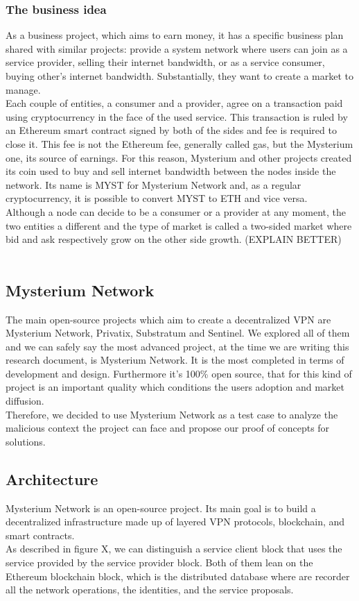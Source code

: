 \documentclass[]{article}
\begin{document}
	\subsubsection{The business idea}
	As a business project, which aims to earn money, it has a specific business plan shared with similar projects: provide a system network where users can join as a service provider, selling their internet bandwidth, or as a service consumer, buying other's internet bandwidth. Substantially, they want to create a market to manage.\\
	Each couple of entities, a consumer and a provider, agree on a transaction paid using cryptocurrency in the face of the used service. This transaction is ruled by an Ethereum smart contract signed by both of the sides and fee is required to close it. This fee is not the Ethereum fee, generally called gas, but the Mysterium one, its source of earnings. For this reason, Mysterium and other projects created its coin used to buy and sell internet bandwidth between the nodes inside the network. Its name is MYST for Mysterium Network and, as a regular cryptocurrency, it is possible to convert MYST to ETH and vice versa.\\
	Although a node can decide to be a consumer or a provider at any moment, the two entities a different and the type of market is called a two-sided market where bid and ask respectively grow on the other side growth. (EXPLAIN BETTER)\\
	\\

	\subsection{Mysterium Network}
	
	The main open-source projects which aim to create a decentralized VPN are Mysterium Network, Privatix, Substratum and Sentinel. We explored all of them and we can safely say the most advanced project, at the time we are writing this research document, is Mysterium Network. It is the most completed in terms of development and design. Furthermore it's 100\% open source, that for this kind of project is an important quality which conditions the users adoption and market diffusion.\\
	Therefore, we decided to use Mysterium Network as a test case to analyze the malicious context the project can face and propose our proof of concepts for solutions.
	
	\subsection{Architecture}
	Mysterium Network is an open-source project. Its main goal is to build a decentralized infrastructure made up of layered VPN protocols, blockchain, and smart contracts.\\
	As described in figure X, we can distinguish a service client block that uses the service provided by the service provider block. Both of them lean on the Ethereum blockchain block, which is the distributed database where are recorder all the network operations, the identities, and the service proposals. 
\end{document}
